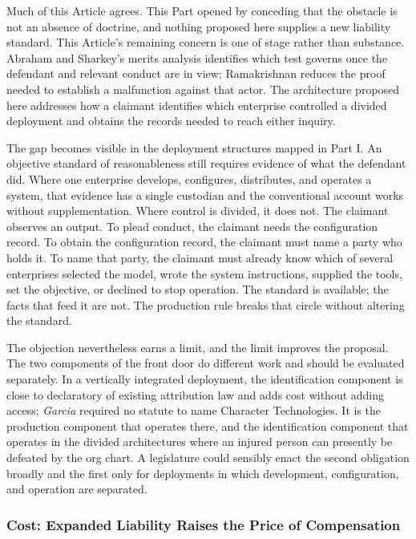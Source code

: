 Much of this Article agrees. This Part opened by conceding that the obstacle is
not an absence of doctrine, and nothing proposed here supplies a new liability
standard. This Article's remaining concern is one of stage rather than
substance. Abraham and Sharkey's merits analysis identifies which test governs
once the defendant and relevant conduct are in view; Ramakrishnan reduces the
proof needed to establish a malfunction against that actor. The architecture
proposed here addresses how a claimant identifies which enterprise controlled
a divided deployment and obtains the records needed to reach either inquiry.

The gap becomes visible in the deployment structures mapped in Part I. An
objective standard of reasonableness still requires evidence of what the
defendant did. Where one enterprise develops, configures, distributes, and
operates a system, that evidence has a single custodian and the conventional
account works without supplementation. Where control is divided, it does not.
The claimant observes an output. To plead conduct, the claimant needs the
configuration record. To obtain the configuration record, the claimant must
name a party who holds it. To name that party, the claimant must already know
which of several enterprises selected the model, wrote the system instructions,
supplied the tools, set the objective, or declined to stop operation. The
standard is available; the facts that feed it are not. The production rule
breaks that circle without altering the standard.

The objection nevertheless earns a limit, and the limit improves the proposal.
The two components of the front door do different work and should be evaluated
separately. In a vertically integrated deployment, the identification component
is close to declaratory of existing attribution law and adds cost without adding
access; \emph{Garcia} required no statute to name Character Technologies. It is
the production component that operates there, and the identification component
that operates in the divided architectures where an injured person can
presently be defeated by the org chart. A legislature could sensibly enact the
second obligation broadly and the first only for deployments in which
development, configuration, and operation are separated.

\subsubsection{Cost: Expanded Liability Raises the Price of Compensation}

